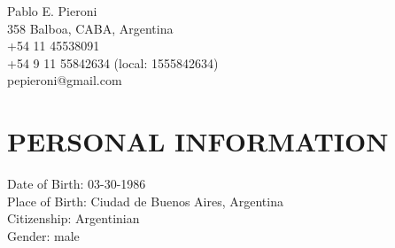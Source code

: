 \documentclass[letterpaper]{article}
\def\name{Pablo E. Pieroni}
\begin{document}
\begin{flushright}
{\huge \name}\\
   358 Balboa, CABA, Argentina\\
   +54 11 45538091 \\
   +54 9 11 55842634 (local: 1555842634)\\
   pepieroni@gmail.com
\end{flushright}

\vspace{0.25in}



\section*{PERSONAL INFORMATION}
   Date of Birth: 03-30-1986\\
   Place of Birth: Ciudad de Buenos Aires, Argentina\\
   Citizenship: Argentinian\\
   Gender: male
 
\end{document}
